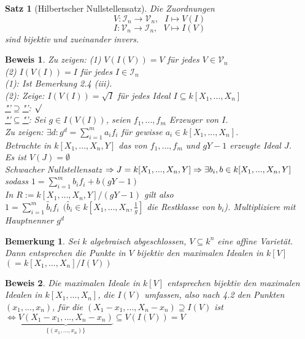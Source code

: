 \documentclass[a4paper,12pt]{report}
\theoremstyle{break}
\newtheorem{Satz}{Satz}
\newtheorem{Bem}[Def]{Bemerkung}
\theoremstyle{nonumberbreak}
\theoremstyle{nonumberplain}
\newtheorem{Bew}{Beweis}
\begin{document}
\begin{Satz}[Hilbertscher Nullstellensatz]
\label{satz:HNS}
Die Zuordnungen
$$V: \mathcal{I}_n \rightarrow \mathcal{V}_n,~~~I\mapsto V(I)$$
$$I: \mathcal{V}_n \rightarrow \mathcal{I}_n,~~~V\mapsto I(V)$$
sind bijektiv und zueinander invers.
\end{Satz}
\begin{Bew}
Zu zeigen: (1) $V(I(V))=V$ für jedes $V\in \mathcal{V}_n$\\
(2) $I(V(I))=I$ für jedes $I\in \mathcal{I}_n$\\
(1): Ist Bemerkung 2.4 (iii).\\
(2): Zeige: $I(V(I))= \sqrt{I}$ für jedes Ideal $I\subseteq k[X_1,...,X_n]$\\
\underline{"'$\supseteq$"'}: $\surd$\\
\underline{"'$\subseteq$"'}: Sei $g\in I(V(I))$, seien $f_1,...,f_m$ Erzeuger von $I$.\\
Zu zeigen: $\exists d:g^d=\sum_{i=1}^m a_if_i$ für gewisse $a_i\in k[X_1,...,X_n]$.\\
Betrachte in $k[X_1,...,X_n,Y]$ das von $f_1,...,f_m$ und $gY-1$ erzeugte Ideal $J$.\\
Es ist $V(J)=\emptyset$\\
Schwacher Nullstellensatz $\Rightarrow J=k[X_1,...,X_n,Y]\\
\Rightarrow \exists b_i,b \in k[X_1,...,X_n,Y]$ sodass $1=\sum_{i=1}^m b_if_i + b(gY-1)$\\
In $R:= k[X_1,...,X_n,Y]/(gY-1)$ gilt also\\
$1=\sum_{i=1}^m\tilde{b_i}f_i~~ (\tilde{b_i}\in k[X_1,...,X_n,\frac{1}{g}]$ die Restklasse von $b_i$). Multipliziere mit Hauptnenner $g^d$
\end{Bew}
\begin{Bem}
Sei $k$ algebraisch abgeschlossen, $V\subseteq k^n$ eine affine Varietät. Dann entsprechen die Punkte in $V$ bijektiv den maximalen Idealen in $k[V]$ $(=k[X_1,...,X_n]/ I(V))$
\end{Bem}
\begin{Bew}
Die maximalen Ideale in $k[V]$ entsprechen bijektiv den maximalen Idealen in $k[X_1,...,X_n]$, die $I(V)$ umfassen, also nach 4.2 den Punkten $(x_1,...,x_n)$, für die $(X_1-x_1,...,X_n-x_n)\supseteq I(V)$ ist\\
$\Leftrightarrow \underbrace{V(X_1-x_1,...,X_n-x_n)}_{\{(x_1,...,x_n)\}}\subseteq V(I(V))= V$
\end{Bew}
\end{document}
